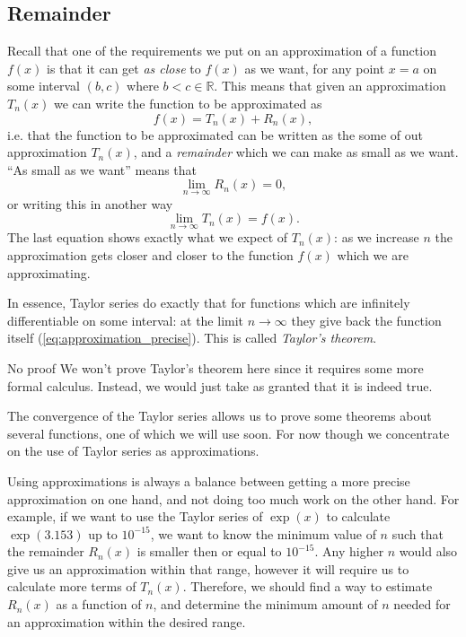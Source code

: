 
\subsection{Remainder}
Recall that one of the requirements we put on an approximation of a function $f(x)$ is that it can get \textit{as close} to $f(x)$ as we want, for any point $x=a$ on some interval $(b,c)$ where $b<c\in\mathbb{R}$. This means that given an approximation $T_{n}(x)$ we can write the function to be approximated as
\begin{equation}
  f(x) = T_{n}(x) + R_{n}(x),
  \label{eq:approximation_remainder}
\end{equation}
i.e. that the function to be approximated can be written as the some of out approximation $T_{n}(x)$, and a \emph{remainder} which we can make as small as we want. ``As small as we want'' means that
\begin{equation}
  \lim\limits_{n\to\infty}R_{n}(x) = 0,
  \label{eq:remainder_to_zero}
\end{equation}
or writing this in another way
\begin{equation}
  \lim\limits_{n\to \infty}T_{n}(x)=f(x).
  \label{eq:approximation_precise}
\end{equation}
The last equation shows exactly what we expect of $T_{n}(x)$: as we increase $n$ the approximation gets closer and closer to the function $f(x)$ which we are approximating.

In essence, Taylor series do exactly that for functions which are infinitely differentiable on some interval: at the limit $n\to\infty$ they give back the function itself (\autoref{eq:approximation_precise}). This is called \emph{Taylor's theorem}.
\begin{note}{No proof}{}
  We won't prove Taylor's theorem here since it requires some more formal calculus. Instead, we would just take as granted that it is indeed true.
\end{note}

The convergence of the Taylor series allows us to prove some theorems about several functions, one of which we will use soon. For now though we concentrate on the use of Taylor series as approximations.

Using approximations is always a balance between getting a more precise approximation on one hand, and not doing too much work on the other hand. For example, if we want to use the Taylor series of $\exp(x)$ to calculate $\exp(3.153)$ up to $10^{-15}$, we want to know the minimum value of $n$ such that the remainder $R_{n}(x)$ is smaller then or equal to $10^{-15}$. Any higher $n$ would also give us an approximation within that range, however it will require us to calculate more terms of $T_{n}(x)$. Therefore, we should find a way to estimate $R_{n}(x)$ as a function of $n$, and determine the minimum amount of $n$ needed for an approximation within the desired range.

